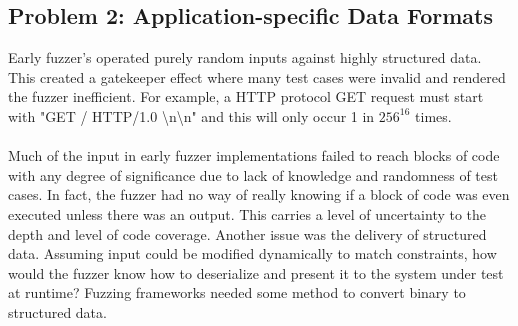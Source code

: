 \subsection{Problem 2: Application-specific Data Formats}
Early fuzzer's operated purely random inputs against highly structured data. This created a gatekeeper effect where many test cases were invalid and rendered the fuzzer inefficient. 
For example, a HTTP protocol GET request  must start with "GET / HTTP/1.0 \textbackslash n\textbackslash n" and this will only occur 1 in $256^{16}$ times\cite{mil-fuzz}. 
\\\\
Much of the input in early fuzzer implementations failed to reach blocks of code with any degree of significance due to lack of knowledge and randomness of test cases. In fact, the fuzzer had no way of really knowing if a block of code was even executed
unless there was an output. This carries a level of uncertainty to the depth and level of code coverage.  Another issue was the delivery of structured data. Assuming input could be modified
dynamically to match constraints, how would the fuzzer know how to deserialize and present it to the system under test at runtime? Fuzzing frameworks needed some method to convert binary to structured data. 
